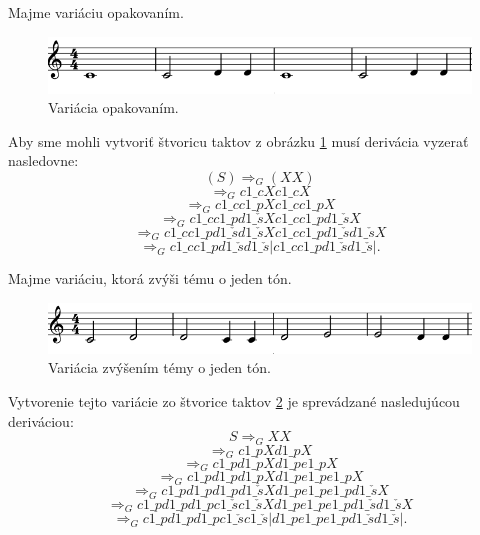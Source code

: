 \begin{example}
Majme variáciu opakovaním.
\begin{figure}[H]
    \centering
    \includegraphics[scale=0.4]{thesis/obrazky-figures/copyvar.png}
    \caption{Variácia opakovaním.}
    \label{fig:copyvar}
    \end{figure}
    Aby sme mohli vytvoriť štvoricu taktov z obrázku \ref{fig:copyvar} musí derivácia vyzerať nasledovne: $$ (S) \Rightarrow_G (XX) $$ 
    $$\Rightarrow_G c1\_cXc1\_cX$$ 
    $$\Rightarrow_G c1\_cc1\_pXc1\_cc1\_pX$$ 
    $$\Rightarrow_G c1\_cc1\_pd1\_\check{s}Xc1\_cc1\_pd1\_\check{s}X$$ 
    $$\Rightarrow_G c1\_cc1\_pd1\_\check{s}d1\_\check{s}Xc1\_cc1\_pd1\_\check{s}d1\_\check{s}X$$
    $$\Rightarrow_G c1\_cc1\_pd1\_\check{s}d1\_\check{s}|c1\_cc1\_pd1\_\check{s}d1\_\check{s}|.$$
\end{example}

\begin{example}
Majme variáciu, ktorá zvýši tému o jeden tón.
\begin{figure}[H]
    \centering
    \includegraphics[scale=0.4]{thesis/obrazky-figures/sequp.png}
    \caption{Variácia zvýšením témy o jeden tón.}
    \label{fig:zvysenievar}
    \end{figure}
    Vytvorenie tejto variácie zo štvorice taktov \ref{fig:zvysenievar} je sprevádzané nasledujúcou deriváciou:
    $$ S \Rightarrow_G XX $$
    $$\Rightarrow_G  c1\_pXd1\_pX$$
    $$\Rightarrow_G  c1\_pd1\_pXd1\_pe1\_pX$$
    $$\Rightarrow_G  c1\_pd1\_pd1\_pXd1\_pe1\_pe1\_pX$$
    $$\Rightarrow_G  c1\_pd1\_pd1\_pd1\_\check{s}Xd1\_pe1\_pe1\_pd1\_\check{s}X$$
    $$\Rightarrow_G  c1\_pd1\_pd1\_pc1\_\check{s}c1\_\check{s}Xd1\_pe1\_pe1\_pd1\_\check{s}d1\_\check{s}X$$
    $$\Rightarrow_G  c1\_pd1\_pd1\_pc1\_\check{s}c1\_\check{s}|d1\_pe1\_pe1\_pd1\_\check{s}d1\_\check{s}|.$$
\end{example}

